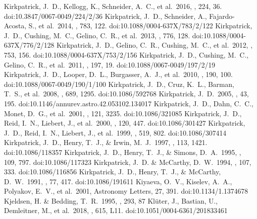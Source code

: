 \documentclass[twocolumn,tighten,twocolappendix]{aastex631}
\begin{document}
\begin{thebibliography}{}
 Kirkpatrick, J.~D., Kellogg, K., Schneider, A.~C., et al.\ 2016, \apjs, 224, 36. doi:10.3847/0067-0049/224/2/36
 Kirkpatrick, J.~D., Schneider, A., Fajardo-Acosta, S., et al.\ 2014, \apj, 783, 122. doi:10.1088/0004-637X/783/2/122
 Kirkpatrick, J.~D., Cushing, M.~C., Gelino, C.~R., et al.\ 2013, \apj, 776, 128. doi:10.1088/0004-637X/776/2/128
 Kirkpatrick, J.~D., Gelino, C.~R., Cushing, M.~C., et al.\ 2012, \apj, 753, 156. doi:10.1088/0004-637X/753/2/156
 Kirkpatrick, J.~D., Cushing, M.~C., Gelino, C.~R., et al.\ 2011, \apjs, 197, 19. doi:10.1088/0067-0049/197/2/19
 Kirkpatrick, J.~D., Looper, D.~L., Burgasser, A.~J., et al.\ 2010, \apjs, 190, 100. doi:10.1088/0067-0049/190/1/100
 Kirkpatrick, J.~D., Cruz, K.~L., Barman, T.~S., et al.\ 2008, \apj, 689, 1295. doi:10.1086/592768
 Kirkpatrick, J.~D.\ 2005, \araa, 43, 195. doi:10.1146/annurev.astro.42.053102.134017
 Kirkpatrick, J.~D., Dahn, C.~C., Monet, D.~G., et al.\ 2001, \aj, 121, 3235. doi:10.1086/321085
 Kirkpatrick, J.~D., Reid, I.~N., Liebert, J., et al.\ 2000, \aj, 120, 447. doi:10.1086/301427
 Kirkpatrick, J.~D., Reid, I.~N., Liebert, J., et al.\ 1999, \apj, 519, 802. doi:10.1086/307414
 Kirkpatrick, J.~D., Henry, T.~J., \& Irwin, M.~J.\ 1997, \aj, 113, 1421. doi:10.1086/118357
 Kirkpatrick, J.~D., Henry, T.~J., \& Simons, D.~A.\ 1995, \aj, 109, 797. doi:10.1086/117323
 Kirkpatrick, J.~D. \& McCarthy, D.~W.\ 1994, \aj, 107, 333. doi:10.1086/116856
 Kirkpatrick, J.~D., Henry, T.~J., \& McCarthy, D.~W.\ 1991, \apjs, 77, 417. doi:10.1086/191611
 Kiyaeva, O.~V., Kiselev, A.~A., Polyakov, E.~V., et al.\ 2001, Astronomy Letters, 27, 391. doi:10.1134/1.1374678
 Kjeldsen, H. \& Bedding, T.~R.\ 1995, \aap, 293, 87
 Kl{\"u}ter, J., Bastian, U., Demleitner, M., et al.\ 2018, \aap, 615, L11. doi:10.1051/0004-6361/201833461

\end{thebibliography}
\end{document}
